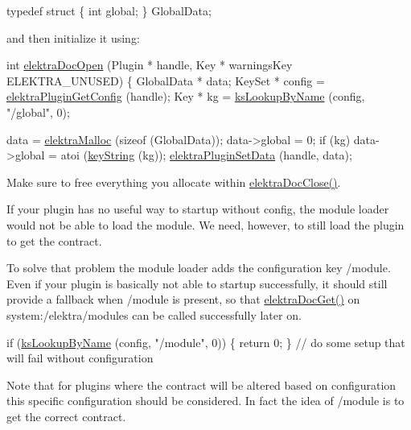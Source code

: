 \begin{DoxyCodeInclude}
\textcolor{keyword}{typedef} \textcolor{keyword}{struct}
\{
        \textcolor{keywordtype}{int} global;
\} GlobalData;
\end{DoxyCodeInclude}
 and then initialize it using\+:


\begin{DoxyCodeInclude}
\textcolor{keywordtype}{int} \hyperlink{group__plugin_ga23c2eb3584e38a4d494eb8f91e5e3d8d}{elektraDocOpen} (Plugin * handle, Key * warningsKey ELEKTRA\_UNUSED)
\{
        GlobalData * data;
        KeySet * config = \hyperlink{group__plugin_ga644bead796506c172817724051c977c9}{elektraPluginGetConfig} (handle);
        Key * kg = \hyperlink{group__keyset_gad65d2cdcbb5381194a1688e169af8a83}{ksLookupByName} (config, \textcolor{stringliteral}{"/global"}, 0);

        data = \hyperlink{internal_8c_a35cdc2e5caed3454cb73b4fc7f37858c}{elektraMalloc} (\textcolor{keyword}{sizeof} (GlobalData));
        data->global = 0;
        \textcolor{keywordflow}{if} (kg) data->global = atoi (\hyperlink{group__keyvalue_ga880936f2481d28e6e2acbe7486a21d05}{keyString} (kg));
        \hyperlink{group__plugin_gaf4b941a52ff55d0ca2a9158d90208ef2}{elektraPluginSetData} (handle, data);
\end{DoxyCodeInclude}
 Make sure to free everything you allocate within \hyperlink{group__plugin_ga1236aefe5b2baf8b7bf636ba5aa9ea29}{elektra\+Doc\+Close()}.

If your plugin has no useful way to startup without config, the module loader would not be able to load the module. We need, however, to still load the plugin to get the contract.

To solve that problem the module loader adds the configuration key /module. Even if your plugin is basically not able to startup successfully, it should still provide a fallback when /module is present, so that \hyperlink{group__plugin_gacb69f3441c6d84241b4362f958fbe313}{elektra\+Doc\+Get()} on system\+:/elektra/modules can be called successfully later on.


\begin{DoxyCodeInclude}
        \textcolor{keywordflow}{if} (\hyperlink{group__keyset_gad65d2cdcbb5381194a1688e169af8a83}{ksLookupByName} (config, \textcolor{stringliteral}{"/module"}, 0))
        \{
                \textcolor{keywordflow}{return} 0;
        \}
        \textcolor{comment}{// do some setup that will fail without configuration}
\end{DoxyCodeInclude}
 Note that for plugins where the contract will be altered based on configuration this specific configuration should be considered. In fact the idea of /module is to get the correct contract.


